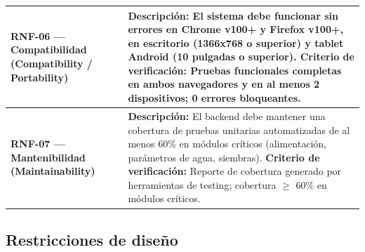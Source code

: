 \documentclass[11pt,a4paper]{article}
\begin{document}
\begin{longtable}{|p{3.5cm}|p{12cm}|}
\textbf{RNF-06 — Compatibilidad (Compatibility / Portability)} &
\textbf{Descripción:} El sistema debe funcionar sin errores en Chrome v100+ y Firefox v100+, en escritorio (1366x768 o superior) y tablet Android (10 pulgadas o superior). \newline
\textbf{Criterio de verificación:} Pruebas funcionales completas en ambos navegadores y en al menos 2 dispositivos; 0 errores bloqueantes. \\ \hline

\textbf{RNF-07 — Mantenibilidad (Maintainability)} &
\textbf{Descripción:} El backend debe mantener una cobertura de pruebas unitarias automatizadas de al menos 60\% en módulos críticos (alimentación, parámetros de agua, siembras). \newline
\textbf{Criterio de verificación:} Reporte de cobertura generado por herramientas de testing; cobertura $ \geq $ 60\% en módulos críticos. \\ \hline

\end{longtable}

\subsection{Restricciones de diseño}
\end{document}
